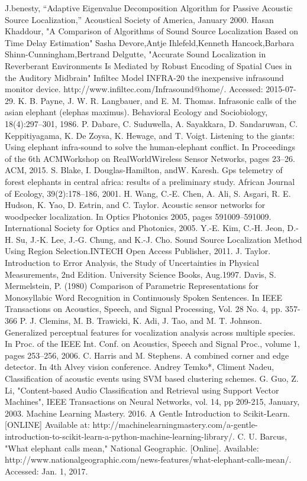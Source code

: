 \documentclass[12pt]{article}
\numberwithin{figure}{section}
\numberwithin{table}{section}
\begin{document}
\begin{thebibliography}{1}
  J.benesty, “Adaptive Eigenvalue Decomposition Algorithm for Passive Acoustic Source Localization,” Acoustical Society of America, January 2000.
 Hasan Khaddour, "A Comparison of Algorithms of Sound Source Localization Based
on Time Delay Estimation"
 Sasha Devore,Antje Ihlefeld,Kenneth Hancock,Barbara Shinn-Cunningham,Bertrand Delgutte,
"Accurate Sound Localization in Reverberant Environments Is Mediated by Robust Encoding of Spatial Cues in the Auditory Midbrain"
 Infiltec Model INFRA-20 the inexpensive infrasound monitor device. http://www.infiltec.com/Infrasound@home/. Accessed: 2015-07-29.
 K. B. Payne, J. W. R. Langbauer, and E. M. Thomas. Infrasonic calls of the asian elephant (elephas maximus). Behavioral Ecology and Sociobiology, 18(4):297–301, 1986.
P. Dabare, C. Suduwella, A. Sayakkara, D. Sandaruwan, C. Keppitiyagama, K. De Zoysa, K. Hewage, and T. Voigt. Listening to the giants: Using elephant infra-sound to solve the human-elephant conflict. In Proceedings of the 6th ACMWorkshop on RealWorldWireless Sensor Networks, pages 23–26. ACM, 2015.
 S. Blake, I. Douglas-Hamilton, andW. Karesh. Gps telemetry of forest elephants in central africa: results of a preliminary study. African Journal of Ecology, 39(2):178–186, 2001.
H. Wang, C.-E. Chen, A. Ali, S. Asgari, R. E. Hudson, K. Yao, D. Estrin, and C. Taylor. Acoustic sensor networks for woodpecker localization. In Optics Photonics 2005, pages 591009–591009. International Society for Optics and Photonics, 2005.
Y.-E. Kim, C.-H. Jeon, D.-H. Su, J.-K. Lee, J.-G. Chung, and K.-J. Cho. Sound Source Localization Method Using Region Selection.INTECH Open Access Publisher, 2011.
J. Taylor. Introduction to Error Analysis, the Study of Uncertainties in Physical Measurements, 2nd Edition. University Science Books, Aug.1997.
 Davis, S. Mermelstein, P. (1980) Comparison of Parametric Representations for Monosyllabic Word Recognition in Continuously Spoken Sentences. In IEEE Transactions on Acoustics, Speech, and Signal Processing, Vol. 28 No. 4, pp. 357-366
 P. J. Clemins, M. B. Trawicki, K. Adi, J. Tao, and M. T. Johnson. Generalized perceptual features for
vocalization analysis across multiple species. In Proc. of the IEEE Int. Conf. on Acoustics, Speech and Signal Proc., volume 1, pages 253–256, 2006.
 C. Harris and M. Stephens. A combined corner and edge detector. In 4th Alvey vision conference.
  Andrey Temko*, Climent Nadeu, Classification of acoustic events using SVM based clustering schemes.
 G. Guo, Z. Li, "Content-based Audio Classification and Retrieval using Support Vector Machines", IEEE
Transactions on Neural Networks, vol. 14, pp 209-215, January, 2003.
 Machine Learning Mastery. 2016. A Gentle Introduction to Scikit-Learn. [ONLINE] Available at: http://machinelearningmastery.com/a-gentle-introduction-to-scikit-learn-a-python-machine-learning-library/. 
 C. U. Barcus, "What elephant calls mean," National Geographic. [Online]. Available: http://www.nationalgeographic.com/news-features/what-elephant-calls-mean/. Accessed: Jan. 1, 2017.

\end{thebibliography}
\end{document}
